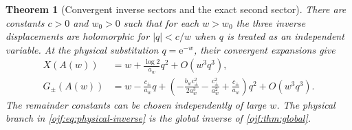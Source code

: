 \documentclass[11pt,a4paper]{article}
\numberwithin{equation}{section}
\newtheorem{theorem}{Theorem}[section]
\theoremstyle{definition}\newtheorem{definition}[theorem]{Definition}
\theoremstyle{remark}\newtheorem{remark}[theorem]{Remark}
\newcommand{\ee}{\mathrm e}\newcommand{\ii}{\mathrm i}\newcommand{\dd}{\,\mathrm d}
\begin{document}
\begin{theorem}[Convergent inverse sectors and the exact second sector]
\label{ojf:thm:large-inverse}
There are constants $c>0$ and $w_0>0$ such that for each $w>w_0$ the
three inverse displacements are holomorphic for $|q|<c/w$ when
$q$ is treated as an independent variable. At the physical substitution
$q=\ee^{-w}$, their convergent expansions give
\begin{align}
 X(A(w))&=w+\frac{\log2}{a_w}q^2+O(w^3q^3),
                                            \label{ojf:eq:physical-inverse}\\
 G_\pm(A(w))&=w-\frac{c_\pm}{a_w}q+
 \left(-\frac{b_wc_\pm^2}{2a_w^3}
       -\frac{c_\pm^2}{a_w^2}+\frac{c_\pm}{a_w}\right)q^2
                   +O(w^3q^3).              \label{ojf:eq:lateral-inverse}
\end{align}
The remainder constants can be chosen independently of large $w$.
The physical branch in \eqref{ojf:eq:physical-inverse} is the global
inverse of \cref{ojf:thm:global}.
\end{theorem}
\end{document}
